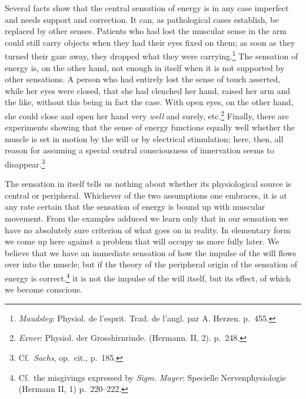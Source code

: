 \documentclass[12pt,a4paper]{book}
\newcommand{\opage}[1]{\marginnote{\footnotesize\textit{[#1]}}}
\begin{document}
Several facts show that the central sensation of energy is in any case
imperfect and needs support and correction. It can, as pathological
cases establish, be replaced by other senses. Patients who had lost the
muscular sense in the arm could still carry objects when they had their
eyes fixed on them; as soon as they turned their gaze away, they
dropped what they were carrying.\footnote{\emph{Maudsley}: Physiol. de
l’esprit. Trad. de l’angl. par A. Herzen. p.~455.} The sensation of
energy is, on the other hand, not enough in itself when it is not
supported by other sensations. A person who had entirely lost the sense
of touch asserted, while her eyes were closed, that she had clenched her
hand, raised her arm and the like, without this being in fact the case.
With open eyes, on the other hand, she could close and open her hand
very \emph{well} and surely,
etc.\footnote{\emph{Exner}: Physiol. der Grosshirnrinde. (Hermann. II,
2). p.~248.} Finally, there are experiments showing that the sense of
energy functions
\opage{147}equally well whether the muscle is set in motion by the will
or by electrical stimulation; here, then, all reason for assuming a
special central consciousness of innervation seems to
disappear.\footnote{Cf.\ \emph{Sachs}, op.\ cit., p.~185.}

The sensation in itself tells us nothing about whether its physiological
source is central or peripheral. Whichever of the two assumptions one
embraces, it is at any rate certain that the sensation of energy is
bound up with muscular movement. From the examples adduced we learn only
that in our sensation we have no absolutely sure criterion of what goes
on in reality. In elementary form we come up here against a problem that
will occupy us more fully later. We believe that we have an immediate
sensation of how the impulse of the will flows over into the muscle; but
if the theory of the peripheral origin of the sensation of energy is
correct,\footnote{Cf.\ the misgivings expressed by \emph{Sigm. Mayer}:
Specielle Nervenphysiologie (Hermann II, 1) p.~220--222.} it is not the
impulse of the will itself, but its effect, of which we become
conscious.
\end{document}
